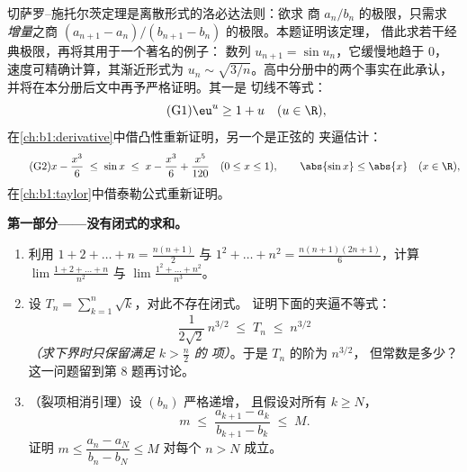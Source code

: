 \begin{problem}[{周末问题——切萨罗--施托尔茨定理，
以及 $u_n \sim \sqrt{3/n}$ 的渐近性，对于 $u_{n+1} = \sin
u_n$}]
\label{pb:b1:seq:1}
切萨罗--施托尔茨定理是离散形式的洛必达法则：欲求
商 $a_n/b_n$ 的极限，只需求
\emph{增量}之商 $(a_{n+1} -
a_n)/(b_{n+1} - b_n)$ 的极限。本题证明该定理，
借此求若干经典极限，再将其用于一个著名的例子：
数列 $u_{n+1} = \sin u_n$，它缓慢地趋于 $0$，
速度可精确计算，其渐近形式为 $u_n \sim \sqrt{3/n}$。高中分册中的两个事实在此承认，
并将在本分册后文中再予严格证明。其一是
切线不等式：
\[
\tag{G1} \eu^{u} \geq 1 + u \quad (u \in \R),
\]
在\cref{ch:b1:derivative}中借凸性重新证明，另一个是正弦的
夹逼估计：
\[
\tag{G2} x - \frac{x^3}{6} \;\leq\; \sin x \;\leq\; x -
\frac{x^3}{6} + \frac{x^5}{120} \quad (0 \leq x \leq 1), \qquad
\abs{\sin x} \leq \abs{x} \quad (x \in \R),
\]
在\cref{ch:b1:taylor}中借泰勒公式重新证明。

\medskip
\noindent\textbf{第一部分——没有闭式的求和。}
\begin{enumerate}
  \item 利用 $1 + 2 + \dots + n = \frac{n(n+1)}{2}$ 与 $1^2 +
        \dots + n^2 = \frac{n(n+1)(2n+1)}{6}$，计算
        $\lim \frac{1 + 2 + \dots + n}{n^2}$ 与 $\lim \frac{1^2 +
        \dots + n^2}{n^3}$。
  \item 设 $T_n = \sum_{k=1}^n \sqrt k$，对此不存在闭式。
        证明下面的夹逼不等式：
        \[
        \frac{1}{2\sqrt 2}\,n^{3/2} \;\leq\; T_n \;\leq\;
        n^{3/2}
        \]
        \emph{（求下界时只保留满足 $k > \frac n2$ 的
        项）}。于是 $T_n$ 的阶为 $n^{3/2}$，
        但常数是多少？这一问题留到第 8 题再讨论。
  \item （裂项相消引理）设 $(b_n)$ 严格递增，
        且假设对所有 $k \geq N$，
        \[
        m \;\leq\; \frac{a_{k+1} - a_k}{b_{k+1} - b_k} \;\leq\;
        M .
        \]
        证明 $m \leq \dfrac{a_n - a_N}{b_n - b_N} \leq M$
        对每个 $n > N$ 成立。
\end{enumerate}


\end{problem}
